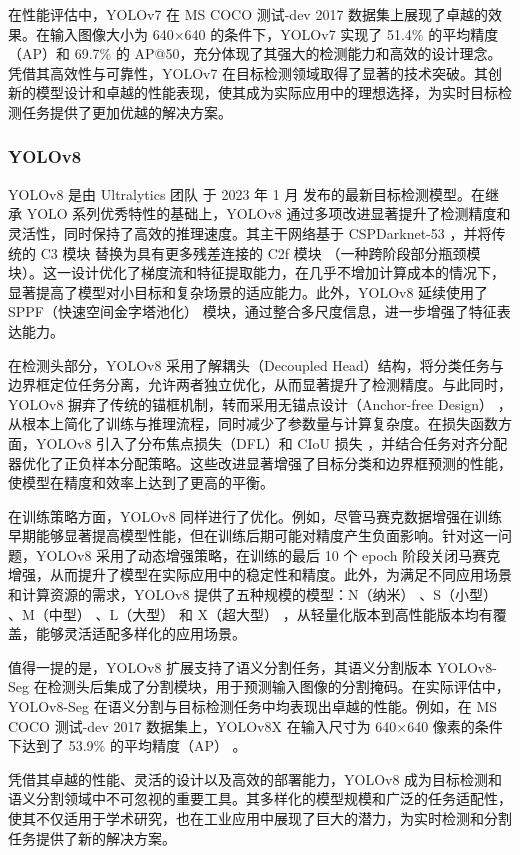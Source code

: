 \documentclass[11pt,twocolumn]{ctexart}
\begin{document}
在性能评估中，YOLOv7 在 MS COCO 测试-dev 2017 数据集上展现了卓越的效果。在输入图像大小为 640×640 的条件下，YOLOv7 实现了 51.4\% 的平均精度（AP）和 69.7\% 的 AP@50，充分体现了其强大的检测能力和高效的设计理念。凭借其高效性与可靠性，YOLOv7 在目标检测领域取得了显著的技术突破。其创新的模型设计和卓越的性能表现，使其成为实际应用中的理想选择，为实时目标检测任务提供了更加优越的解决方案。
\subsubsection{YOLOv8}
YOLOv8 是由 Ultralytics 团队 于 2023 年 1 月 发布的最新目标检测模型。在继承 YOLO 系列优秀特性的基础上，YOLOv8 通过多项改进显著提升了检测精度和灵活性，同时保持了高效的推理速度。其主干网络基于 CSPDarknet-53 ，并将传统的 C3 模块 替换为具有更多残差连接的 C2f 模块 （一种跨阶段部分瓶颈模块）。这一设计优化了梯度流和特征提取能力，在几乎不增加计算成本的情况下，显著提高了模型对小目标和复杂场景的适应能力。此外，YOLOv8 延续使用了 SPPF（快速空间金字塔池化） 模块，通过整合多尺度信息，进一步增强了特征表达能力。

在检测头部分，YOLOv8 采用了解耦头（Decoupled Head）结构，将分类任务与边界框定位任务分离，允许两者独立优化，从而显著提升了检测精度。与此同时，YOLOv8 摒弃了传统的锚框机制，转而采用无锚点设计（Anchor-free Design） ，从根本上简化了训练与推理流程，同时减少了参数量与计算复杂度。在损失函数方面，YOLOv8 引入了分布焦点损失（DFL）和 CIoU 损失 ，并结合任务对齐分配器优化了正负样本分配策略。这些改进显著增强了目标分类和边界框预测的性能，使模型在精度和效率上达到了更高的平衡。

在训练策略方面，YOLOv8 同样进行了优化。例如，尽管马赛克数据增强在训练早期能够显著提高模型性能，但在训练后期可能对精度产生负面影响。针对这一问题，YOLOv8 采用了动态增强策略，在训练的最后 10 个 epoch 阶段关闭马赛克增强，从而提升了模型在实际应用中的稳定性和精度。此外，为满足不同应用场景和计算资源的需求，YOLOv8 提供了五种规模的模型：N（纳米） 、S（小型） 、M（中型） 、L（大型） 和 X（超大型） ，从轻量化版本到高性能版本均有覆盖，能够灵活适配多样化的应用场景。

值得一提的是，YOLOv8 扩展支持了语义分割任务，其语义分割版本 YOLOv8-Seg 在检测头后集成了分割模块，用于预测输入图像的分割掩码。在实际评估中，YOLOv8-Seg 在语义分割与目标检测任务中均表现出卓越的性能。例如，在 MS COCO 测试-dev 2017 数据集上，YOLOv8X 在输入尺寸为 640×640 像素的条件下达到了 53.9\% 的平均精度（AP） 。

凭借其卓越的性能、灵活的设计以及高效的部署能力，YOLOv8 成为目标检测和语义分割领域中不可忽视的重要工具。其多样化的模型规模和广泛的任务适配性，使其不仅适用于学术研究，也在工业应用中展现了巨大的潜力，为实时检测和分割任务提供了新的解决方案。
\end{document}
